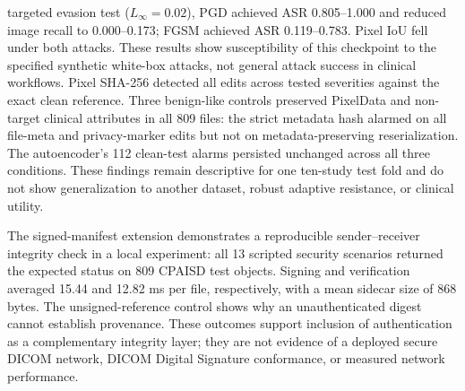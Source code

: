 \documentclass[journal]{IEEEtran}
\begin{document}
targeted evasion test ($L_\infty=0.02$), PGD achieved ASR 0.805--1.000 and reduced image recall to 0.000--0.173; FGSM achieved ASR 0.119--0.783. Pixel IoU fell under both attacks. These results show susceptibility of this checkpoint to the specified synthetic white-box attacks, not general attack success in clinical workflows. Pixel SHA-256 detected all edits across tested severities against the exact clean reference. Three benign-like controls preserved PixelData and non-target clinical attributes in all 809 files: the strict metadata hash alarmed on all file-meta and privacy-marker edits but not on metadata-preserving reserialization. The autoencoder's 112 clean-test alarms persisted unchanged across all three conditions. These findings remain descriptive for one ten-study test fold and do not show generalization to another dataset, robust adaptive resistance, or clinical utility.
  
  The signed-manifest extension demonstrates a reproducible sender--receiver integrity check in a local experiment: all 13 scripted security scenarios returned the expected status on 809 CPAISD test objects. Signing and verification averaged 15.44 and 12.82 ms per file, respectively, with a mean sidecar size of 868 bytes. The unsigned-reference control shows why an unauthenticated digest cannot establish provenance. These outcomes support inclusion of authentication as a complementary integrity layer; they are not evidence of a deployed secure DICOM network, DICOM Digital Signature conformance, or measured network performance.
\end{document}
